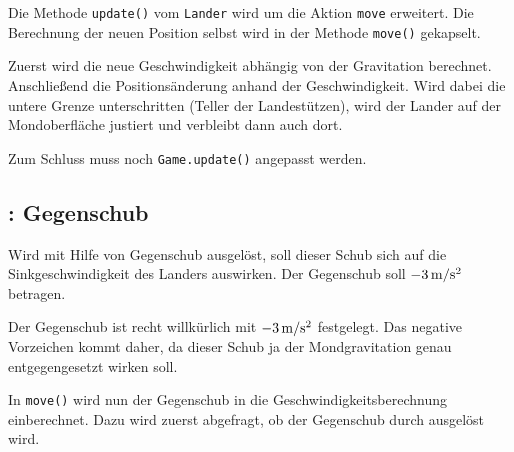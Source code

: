 
Die Methode \texttt{update()} vom \texttt{Lander} wird um die Aktion \texttt{move} erweitert. Die Berechnung der neuen Position selbst wird in der Methode \texttt{move()} gekapselt.


Zuerst wird die neue Geschwindigkeit abhängig von der Gravitation berechnet. Anschließend die Positionsänderung anhand der Geschwindigkeit. Wird dabei die untere Grenze unterschritten (Teller der Landestützen), wird der Lander auf der Mondoberfläche justiert und verbleibt dann auch dort.


Zum Schluss muss noch \texttt{Game.update()} angepasst werden.



\subsection{: Gegenschub}

	Wird mit Hilfe von \keys{\SPACE} Gegenschub ausgelöst, soll dieser Schub sich auf die Sinkgeschwindigkeit des Landers auswirken. Der Gegenschub soll $\unit[-3]{m/s^2}$ betragen.
\er

Der Gegenschub ist recht willkürlich mit $\unit[-3]{m/s^2}$ festgelegt. Das negative Vorzeichen kommt daher, da dieser Schub ja der Mondgravitation genau entgegengesetzt wirken soll.


In \texttt{move()} wird nun der Gegenschub in die Geschwindigkeitsberechnung einberechnet. Dazu wird zuerst abgefragt, ob der Gegenschub durch \texttt{\keys{\SPACE}} ausgelöst wird. 

